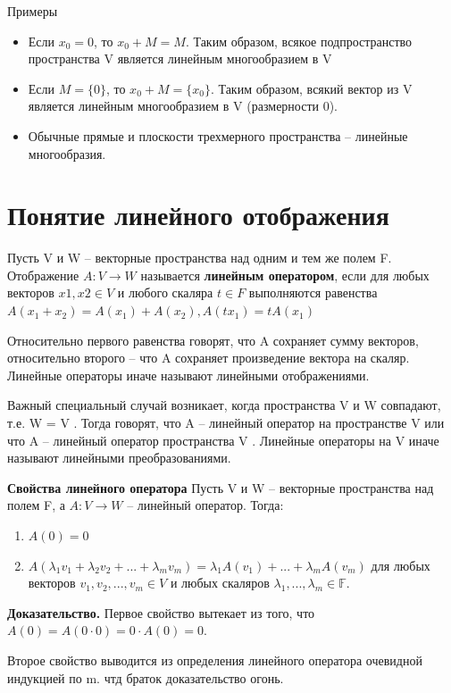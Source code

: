 \documentclass[a4paper]{article}
\begin{document}
Примеры
\begin{itemize}
\item Если $x_0 = 0$, то $x_0 + M = M$. Таким образом, всякое
подпространство пространства V является линейным многообразием в V
\item Если $M = \{ 0 \}$, то $x_0 + M = \{ x_0 \}$. Таким образом, всякий
вектор из V является линейным многообразием в V (размерности 0).
\item Обычные прямые и плоскости трехмерного пространства –
линейные многообразия.
\end{itemize}

\section*{Понятие линейного отображения}

Пусть V и W – векторные пространства над одним и тем же полем F.
Отображение $A: V \rightarrow W$ называется \textbf{линейным оператором}, если
для любых векторов $x1, x2 \in V$ и любого скаляра $t \in F$ выполняются
равенства $A(x_1+x_2) = A(x_1) + A(x_2), A(tx_1) = tA(x_1)$

Относительно первого равенства говорят, что A сохраняет сумму векторов,
относительно второго – что A сохраняет произведение вектора на скаляр.
Линейные операторы иначе называют линейными отображениями.

Важный специальный случай возникает, когда пространства V и W
совпадают, т.е. W = V . Тогда говорят, что A – линейный оператор
на пространстве V или что A – линейный оператор пространства V .
Линейные операторы на V иначе называют линейными преобразованиями.

\textbf{Свойства линейного оператора}
Пусть V и W – векторные пространства над полем F, а $A: V \rightarrow W$ –
линейный оператор. Тогда:
\begin{enumerate}
\item $A(0) = 0$
\item $A(\lambda_1v_1 + \lambda_2v_2 + ... + \lambda_mv_m) = \lambda_1A(v_1)+...+\lambda_m A(v_m)$ для любых векторов $v_1,v_2, ..., v_m \in V$ и любых скаляров $\lambda_1, ..., \lambda_m \in \mathbb{F}$.
\end{enumerate}

\textbf{Доказательство.} Первое свойство вытекает из того, что $A(0) = A(0 \cdot 0) = 0 \cdot A(0) = 0$.

Второе свойство выводится из определения линейного оператора очевидной индукцией по m. чтд браток доказательство огонь.
\end{document}

